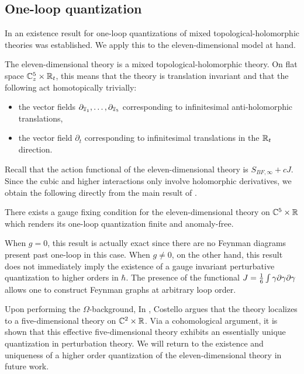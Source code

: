 
\subsection{One-loop quantization}

In \cite{GRWthf} an existence result for one-loop quantizations of mixed topological-holomorphic theories was established. 
We apply this to the eleven-dimensional model at hand. 

The eleven-dimensional theory is a mixed topological-holomorphic theory.
On flat space $\mathbb C^5_z \times \mathbb R_t$, this means that the theory is translation invariant and that the following act homotopically trivially:
\begin{itemize}
\item the vector fields $\partial_{\overline{z}_1}, \ldots, \partial_{\overline{z}_{5}}$ corresponding to infinitesimal anti-holomorphic translations,
\item the vector field $\partial_t$ corresponding to infinitesimal translations in the $\mathbb R_t$ direction. 
\end{itemize}

Recall that the action functional of the eleven-dimensional theory is $S_{BF, \infty} + c J$. 
Since the cubic and higher interactions only involve holomorphic derivatives, we obtain the following directly from the main result of \cite{GRWthf}. 

\begin{thm}
There exists a gauge fixing condition for the eleven-dimensional theory on $\mathbb C^5 \times \mathbb R$ which renders its one-loop quantization finite and anomaly-free. 
\end{thm} 

When $g=0$, this result is actually exact
since there are no Feynman diagrams present past one-loop in this case. 
When $g \ne 0$, on the other hand, this result does not immediately imply the existence of a gauge invariant perturbative quantization to higher orders in $\hbar$. 
The presence of the functional $J = \frac16 \int \gamma \partial \gamma \partial \gamma$ allows one to construct Feynman graphs at arbitrary loop order. 

Upon performing the $\Omega$-background,
In \cite{CostelloM5}, Costello argues that the theory localizes to a five-dimensional theory on $\mathbb C^2 \times \mathbb R$. 
Via a cohomological argument, it is shown that this effective five-dimensional theory exhibits an essentially unique quantization in perturbation theory. 
We will return to the existence and uniqueness of a higher order quantization of the eleven-dimensional theory in future work. 
